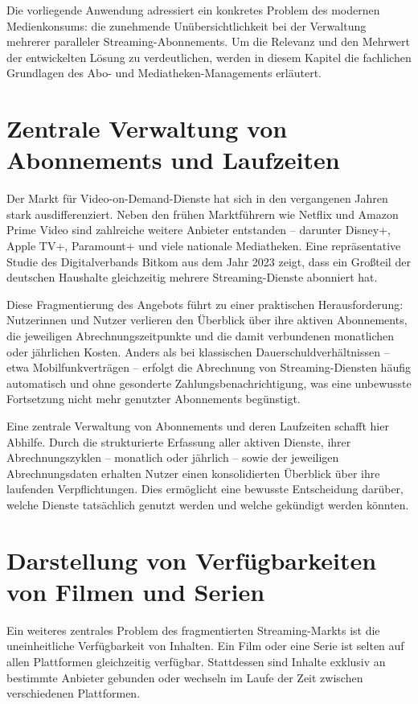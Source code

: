Die vorliegende Anwendung adressiert ein konkretes Problem des modernen
Medienkonsums: die zunehmende Unübersichtlichkeit bei der Verwaltung mehrerer
paralleler Streaming-Abonnements. Um die Relevanz und den Mehrwert der
entwickelten Lösung zu verdeutlichen, werden in diesem Kapitel die fachlichen
Grundlagen des Abo- und Mediatheken-Managements erläutert.


\section{Zentrale Verwaltung von Abonnements und Laufzeiten}

Der Markt für Video-on-Demand-Dienste hat sich in den vergangenen Jahren stark
ausdifferenziert. Neben den frühen Marktführern wie Netflix und Amazon Prime
Video sind zahlreiche weitere Anbieter entstanden -- darunter Disney+, Apple TV+,
Paramount+ und viele nationale Mediatheken. Eine repräsentative Studie des
Digitalverbands Bitkom aus dem Jahr 2023 zeigt, dass ein Großteil der deutschen
Haushalte gleichzeitig mehrere Streaming-Dienste abonniert hat.

Diese Fragmentierung des Angebots führt zu einer praktischen Herausforderung:
Nutzerinnen und Nutzer verlieren den Überblick über ihre aktiven Abonnements,
die jeweiligen Abrechnungszeitpunkte und die damit verbundenen monatlichen oder
jährlichen Kosten. Anders als bei klassischen Dauerschuldverhältnissen -- etwa
Mobilfunkverträgen -- erfolgt die Abrechnung von Streaming-Diensten häufig
automatisch und ohne gesonderte Zahlungsbenachrichtigung, was eine unbewusste
Fortsetzung nicht mehr genutzter Abonnements begünstigt.

Eine zentrale Verwaltung von Abonnements und deren Laufzeiten schafft hier
Abhilfe. Durch die strukturierte Erfassung aller aktiven Dienste, ihrer
Abrechnungszyklen -- monatlich oder jährlich -- sowie der jeweiligen
Abrechnungsdaten erhalten Nutzer einen konsolidierten Überblick über ihre
laufenden Verpflichtungen. Dies ermöglicht eine bewusste Entscheidung darüber,
welche Dienste tatsächlich genutzt werden und welche gekündigt werden könnten.


\section{Darstellung von Verfügbarkeiten von Filmen und Serien}

Ein weiteres zentrales Problem des fragmentierten Streaming-Markts ist die
uneinheitliche Verfügbarkeit von Inhalten. Ein Film oder eine Serie ist
selten auf allen Plattformen gleichzeitig verfügbar. Stattdessen sind Inhalte
exklusiv an bestimmte Anbieter gebunden oder wechseln im Laufe der Zeit
zwischen verschiedenen Plattformen.

